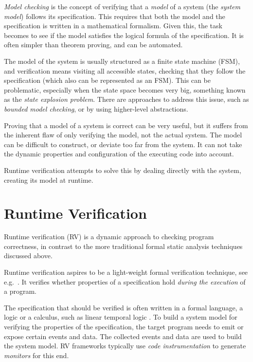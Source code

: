 \documentclass[a4paper,11pt]{kth-mag}
\begin{document}
\textit{Model checking} is the concept of verifying that a \textit{model} of a
system (the \textit{system model}) follows its specification. This requires
that both the model and the specification is written in a mathematical
formalism.  Given this, the task becomes to see if the model satisfies the
logical formula of the specification. It is often simpler than theorem proving,
and can be automated.

The model of the system is usually structured as a finite state machine (FSM),
and verification means visiting all accessible states, checking that they
follow the specification (which also can be represented as an FSM). This can be
problematic, especially when the state space becomes very big, something known
as the \textit{state explosion problem}. There are approaches to address this
issue, such as \textit{bounded model checking}, or by using higher-level
abstractions.

Proving that a model of a system is correct can be very useful, but it suffers
from the inherent flaw of only verifying the model, not the actual system. The
model can be difficult to construct, or deviate too far from the system. It can
not take the dynamic properties and configuration of the executing code into
account.

Runtime verification attempts to solve this by dealing directly with the
system, creating its model at runtime.


\section{Runtime Verification} \label{section-rv}

Runtime verification (RV) is a dynamic approach to checking program
correctness, in contrast to the more traditional formal static analysis
techniques discussed above.

Runtime verification aspires to be a light-weight formal verification
technique, see e.g.\ \cite{leucker09abriefaccount,delgado04taxonomy}. It
verifies whether properties of a specification hold \textit{during the
execution} of a program.

The specification that should be verified is often written in a formal
language, a logic or a calculus, such as linear temporal logic \cite{pnueli77}.
To build a system model for verifying the properties of the specification, the
target program needs to emit or expose certain events and data. The collected
events and data are used to build the system model. RV frameworks typically
use \textit{code instrumentation} to generate \textit{monitors} for this end.
\end{document}
